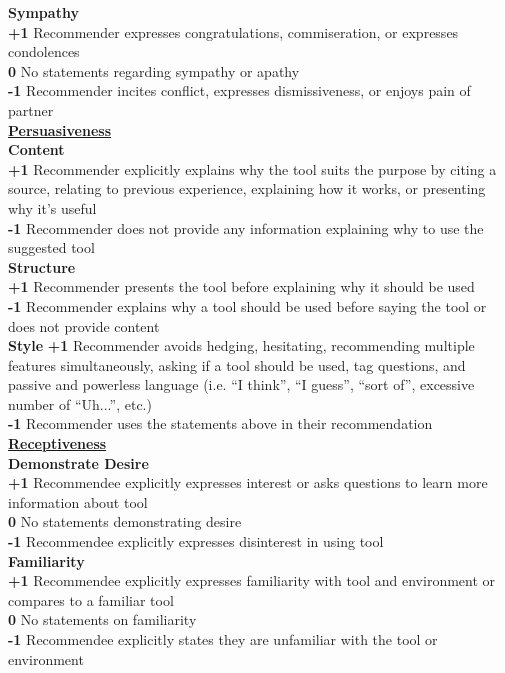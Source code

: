\noindent
\textbf{Sympathy} \\
\textbf{+1} Recommender expresses congratulations, commiseration, or expresses condolences \\
\textbf{ 0}   No statements regarding sympathy or apathy \\
\textbf{-1} Recommender incites conflict, expresses dismissiveness, or enjoys pain of partner \\

\noindent
\textbf{\underline{Persuasiveness}}\\
\noindent
\textbf{Content} \\
\textbf{+1} Recommender explicitly explains why the tool suits the purpose by citing a source, relating to previous experience, explaining how it works, or presenting why it's useful  \\
\textbf{-1} Recommender does not provide any information explaining why to use the suggested tool \\

\noindent
\textbf{Structure} \\
\textbf{+1} Recommender presents the tool before explaining why it should be used \\
\textbf{-1} Recommender explains why a tool should be used before saying the tool or does not provide content \\

\noindent
\textbf{Style}
\textbf{+1} Recommender avoids hedging, hesitating, recommending multiple features simultaneously, asking if a tool should be used, tag questions, and passive and powerless language (i.e. ``I think'', ``I guess'', ``sort of'', excessive number of ``Uh...'', etc.) \\
\textbf{-1} Recommender uses the statements above in their recommendation\\

\noindent
\textbf{\underline{Receptiveness}} \\
\textbf{Demonstrate Desire} \\
\textbf{+1} Recommendee explicitly expresses interest or asks questions to learn more information about tool \\
\textbf{0}  No statements demonstrating desire \\
\textbf{-1} Recommendee explicitly expresses disinterest in using tool \\

\noindent
\textbf{Familiarity}\\
\textbf{+1} Recommendee explicitly expresses familiarity with tool and environment or compares to a familiar tool \\
\textbf{0}  No statements on familiarity \\
\textbf{-1} Recommendee explicitly states they are unfamiliar with the tool or environment \\


